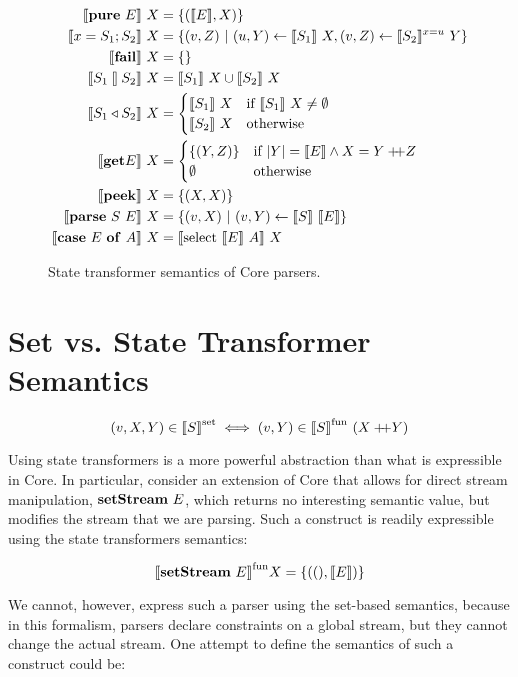 \documentclass{article}
\begin{document}
\begin{figure}[H]
\begin{align*}
\llbracket{\mathbf{pure}~{E}}\rrbracket~X &= \{{ (\llbracket{E}\rrbracket, X) }\} \\
\llbracket{{x} = {S_1}; {S_2}}\rrbracket~X &=  \{{ (v,Z) ~|~ (u,Y) \leftarrow \llbracket{S_1}\rrbracket~X,
                                        (v,Z) \leftarrow \llbracket{S_2}\rrbracket^{x=u}~Y }\} \\
\llbracket{\mathbf{fail}}\rrbracket~X   &= \{{ }\} \\
\llbracket{{S_1} \talloblong {S_2}}\rrbracket~X &= \llbracket{S_1}\rrbracket~X \cup \llbracket{S_2}\rrbracket~X \\
\llbracket{{S_1} \triangleleft {S_2}}\rrbracket~X &=
  \begin{cases}
  \llbracket{S_1}\rrbracket~X &\text{if}~\llbracket{S_1}\rrbracket~X \neq \emptyset \\
  \llbracket{S_2}\rrbracket~X &\text{otherwise}
  \end{cases} \\
\llbracket{\mathbf{get}{E}}\rrbracket~X &=
  \begin{cases}
  \{{ (Y,Z) }\} &\text{if}~|Y| = \llbracket{E}\rrbracket \wedge X = Y +\!\!\!+ Z \\
  \emptyset     &\text{otherwise}
  \end{cases} \\
\llbracket{\mathbf{peek}}\rrbracket~X &= \{{(X,X)}\} \\
\llbracket{\mathbf{parse}~{S}~{E}}\rrbracket~X &= \{{ (v,X) ~|~ (v,Y) \leftarrow \llbracket{S}\rrbracket~\llbracket{E}\rrbracket }\} \\
\llbracket{\mathbf{case}~{E}~\mathbf{of}~{A}}\rrbracket~X &= \llbracket{\mathrm{select}~{\llbracket{E}\rrbracket}~{A}}\rrbracket~X
\end{align*}
\caption{State transformer semantics of Core parsers.}
\end{figure}


\section{Set vs. State Transformer Semantics}

\[
(v,X,Y) \in {\llbracket{S}\rrbracket}^{\mathrm{set}} \iff (v,Y) \in {\llbracket{S}\rrbracket}^{\mathrm{fun}}~(X +\!\!\!+ Y)
\]

Using state transformers is a more powerful abstraction than what is
expressible in Core. In particular, consider an extension of Core
that allows for direct stream manipulation, $\mathbf{setStream}~{E}$, which returns
no interesting semantic value, but modifies the stream that we are parsing.
Such a construct is readily expressible using the state transformers semantics:

\[
{\llbracket{\mathbf{setStream}~{E}}\rrbracket}^{\mathrm{fun}} X = \{{((),\llbracket{E}\rrbracket)}\}
\]

We cannot, however, express such a parser using the set-based semantics,
because in this formalism, parsers declare constraints on a global stream,
but they cannot change the actual stream.  One attempt to define the
semantics of such a construct could be:
\end{document}

